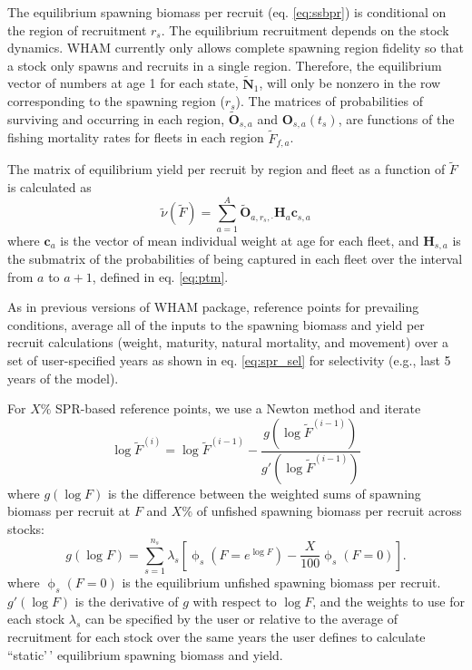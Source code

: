 \documentclass[
]{article}
\begin{document}
The equilibrium spawning biomass per recruit (eq. \ref{eq:ssbpr}) is
conditional on the region of recruitment \(r_s\). The equilibrium
recruitment depends on the stock dynamics. WHAM currently only allows
complete spawning region fidelity so that a stock only spawns and
recruits in a single region. Therefore, the equilibrium vector of
numbers at age 1 for each state, \(\widetilde {\mathbf{N}}_{1}\), will
only be nonzero in the row corresponding to the spawning region
(\(r_s\)). The matrices of probabilities of surviving and occurring in
each region, \(\widetilde{\mathbf{O}}_{s,a}\) and
\(\mathbf{O}_{s,a}(t_s)\), are functions of the fishing mortality rates
for fleets in each region \(\widetilde F_{f,a}\).

The matrix of equilibrium yield per recruit by region and fleet as a
function of \(\widetilde F\) is calculated as
\begin{equation}\label{eq:ypr}
 \widetilde{\nu}({\widetilde{F}}) = \sum^{A}_{a=1} \widetilde{\mathbf{O}}_{a,r_s,\cdot} \mathbf{H}_{a} \mathbf{c}_{s,a}
\end{equation} where \(\mathbf{c}_a\) is the vector of mean individual
weight at age for each fleet, and \(\mathbf{H}_{s,a}\) is the submatrix
of the probabilities of being captured in each fleet over the interval
from \(a\) to \(a+1\), defined in eq. \ref{eq:ptm}.

As in previous versions of WHAM package, reference points for prevailing
conditions, average all of the inputs to the spawning biomass and yield
per recruit calculations (weight, maturity, natural mortality, and
movement) over a set of user-specified years as shown in eq.
\ref{eq:spr_sel} for selectivity (e.g., last 5 years of the model).

For \(X\%\) SPR-based reference points, we use a Newton method and
iterate \begin{equation}\label{eq:newton}
  \log\widetilde{F}^{(i)} = \log\widetilde{F}^{(i-1)} - \frac{g\left(\log\widetilde{F}^{(i-1)}\right)}{g'\left(\log\widetilde{F}^{(i-1)}\right)}
\end{equation} where \(g(\log F)\) is the difference between the
weighted sums of spawning biomass per recruit at \(F\) and \(X\)\% of
unfished spawning biomass per recruit across stocks:
\begin{equation}\label{eq:newton-obj}
  g(\log F) = \sum^{n_s}_{s=1} \lambda_s\left[\upphi_s\left(F = e^{\log F}\right) - \frac{X}{100}\upphi_s\left(F=0\right)\right].
\end{equation} where \(\upphi_s\left(F=0\right)\) is the equilibrium
unfished spawning biomass per recruit. \(g'(\log F)\) is the derivative
of \(g\) with respect to \(\log F\), and the weights to use for each
stock \(\lambda_s\) can be specified by the user or relative to the
average of recruitment for each stock over the same years the user
defines to calculate ``static'\,' equilibrium spawning biomass and
yield.
\end{document}
